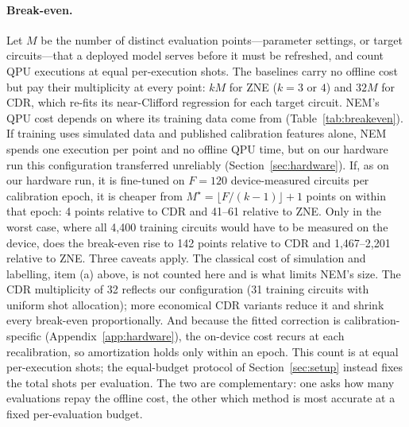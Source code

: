 \documentclass[11pt]{article}
\begin{document}
\paragraph{Break-even.}
Let $M$ be the number of distinct evaluation points---parameter settings, or target circuits---that a deployed model serves before it must be refreshed, and count QPU executions at equal per-execution shots. The baselines carry no offline cost but pay their multiplicity at every point: $kM$ for ZNE ($k=3$ or $4$) and $32M$ for CDR, which re-fits its near-Clifford regression for each target circuit. NEM's QPU cost depends on where its training data come from (Table~\ref{tab:breakeven}). If training uses simulated data and published calibration features alone, NEM spends one execution per point and no offline QPU time, but on our hardware run this configuration transferred unreliably (Section~\ref{sec:hardware}). If, as on our hardware run, it is fine-tuned on $F=120$ device-measured circuits per calibration epoch, it is cheaper from $M^\star=\lfloor F/(k-1)\rfloor+1$ points on within that epoch: 4 points relative to CDR and 41--61 relative to ZNE. Only in the worst case, where all 4{,}400 training circuits would have to be measured on the device, does the break-even rise to 142 points relative to CDR and 1{,}467--2{,}201 relative to ZNE. Three caveats apply. The classical cost of simulation and labelling, item (a) above, is not counted here and is what limits NEM's size. The CDR multiplicity of 32 reflects our configuration (31 training circuits with uniform shot allocation); more economical CDR variants \citep{czarnik2025improving} reduce it and shrink every break-even proportionally. And because the fitted correction is calibration-specific (Appendix~\ref{app:hardware}), the on-device cost recurs at each recalibration, so amortization holds only within an epoch. This count is at equal per-execution shots; the equal-budget protocol of Section~\ref{sec:setup} instead fixes the total shots per evaluation. The two are complementary: one asks how many evaluations repay the offline cost, the other which method is most accurate at a fixed per-evaluation budget.
\end{document}
